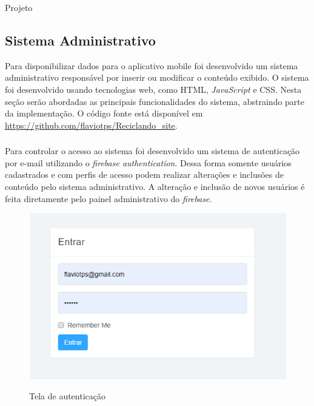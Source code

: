\documentclass[
	12pt,				%
	openany,			%
	twoside,			%
	a4paper,			%
	english,			%
	french,				%
	spanish,			%
	brazil				%
	]{abntex2}
\begin{document}
\begin{chapter}{Projeto}
\newpage
\subsection{Sistema Administrativo} \label{Sistema Administrativo}
Para disponibilizar dados para o aplicativo mobile foi desenvolvido um sistema administrativo responsável por inserir ou modificar o conteúdo exibido. O sistema foi desenvolvido usando tecnologias web, como HTML, \textit{JavaScript} e CSS. Nesta seção serão abordadas as principais funcionalidades do sistema, abstraindo parte da implementação. O código fonte está disponível em \url{https://github.com/flaviotps/Reciclando_site}.

\subsubsection{} \label{tela_auth}
Para controlar o acesso ao sistema foi desenvolvido um sistema de autenticação por e-mail utilizando o \textit{firebase authentication}. Dessa forma somente usuários cadastrados e com perfis de acesso podem realizar alterações e inclusões de conteúdo pelo sistema administrativo. 
A alteração e inclusão de novos usuários é feita diretamente pelo painel administrativo do \textit{firebase}.


\begin{figure}[h]
\centering
   \caption{Tela de autenticação}
   \includegraphics[scale=0.85]{media/tela_login_site_1.png}
     \label{fig:tela_login_site_1}
\end{figure}


\end{chapter}
\end{document}
